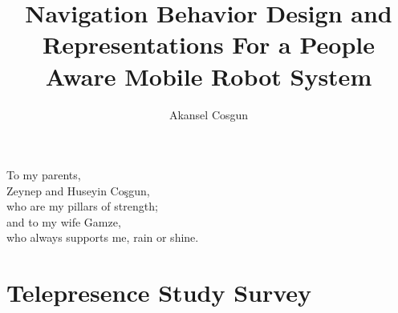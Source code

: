 \documentclass[12pt]{gatech-thesis}
\title{Navigation Behavior Design and Representations For a People Aware Mobile Robot System}
\author{Akansel Cosgun}
\begin{document}
%

\begin{preliminary}

\begin{dedication}
\null\vfil
{\large
\begin{center}
To my parents,\\\vspace{12pt}
Zeynep and Huseyin Co\c{s}gun,\\\vspace{12pt}
who are my pillars of strength;\\\vspace{12pt}
and to my wife Gamze,\\\vspace{12pt}
who always supports me, rain or shine.\\\vspace{12pt}
\end{center}}
\vfil\null
\end{dedication}




\contents

\end{preliminary}










\appendix

%
%
%
\chapter{Telepresence Study Survey}
\label{chapter:telepresence_user_study_survey_questions}
\end{document}
